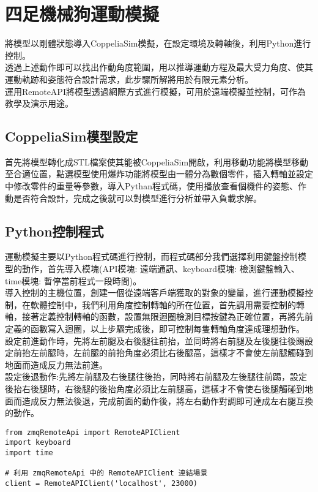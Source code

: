 \chapter{四足機械狗運動模擬}
將模型以剛體狀態導入CoppeliaSim模擬，在設定環境及轉軸後，利用Python進行控制。\\
透過上述動作即可以找出作動角度範圍，用以推導運動方程及最大受力角度、使其運動軌跡和姿態符合設計需求，此步驟所解將用於有限元素分析。\\
運用RemoteAPI將模型透過網際方式進行模擬，可用於遠端模擬並控制，可作為教學及演示用途。\\

\section{CoppeliaSim模型設定}
首先將模型轉化成STL檔案使其能被CoppeliaSim開啟，利用移動功能將模型移動至合適位置，點選模型使用爆炸功能將模型由一體分為數個零件，插入轉軸並設定中修改零件的重量等參數，導入Pythan程式碼，使用播放查看個機件的姿態、作動是否符合設計，完成之後就可以對模型進行分析並帶入負載求解。\


\section{Python控制程式}
運動模擬主要以Python程式碼進行控制，而程式碼部分我們選擇利用鍵盤控制模型的動作，首先導入模塊(API模塊: 遠端通訊、keyboard模塊: 檢測鍵盤輸入、time模塊: 暫停當前程式一段時間)。\\
導入控制的主機位置，創建一個從遠端客戶端獲取的對象的變量，進行運動模擬控制，在軟體控制中，我們利用角度控制轉軸的所在位置，首先調用需要控制的轉軸，接著定義控制轉軸的函數，設置無限迴圈檢測目標按鍵為正確位置，再將先前定義的函數寫入迴圈，以上步驟完成後，即可控制每隻轉軸角度達成理想動作。\\
設定前進動作時，先將左前腿及右後腿往前抬，並同時將右前腿及左後腿往後踢設定前抬左前腿時，左前腿的前抬角度必須比右後腿高，這樣才不會使左前腿觸碰到地面而造成反力無法前進。\\
設定後退動作:先將左前腿及右後腿往後抬，同時將右前腿及左後腿往前踢，設定後抬右後腿時，右後腿的後抬角度必須比左前腿高，這樣才不會使右後腿觸碰到地面而造成反力無法後退，完成前面的動作後，將左右動作對調即可達成左右腿互換的動作。\\

\begin{lstlisting}
from zmqRemoteApi import RemoteAPIClient
import keyboard
import time

# 利用 zmqRemoteApi 中的 RemoteAPIClient 連結場景
client = RemoteAPIClient('localhost', 23000)
\end{lstlisting}

